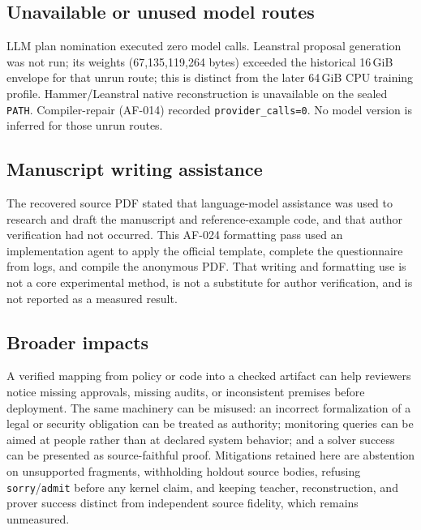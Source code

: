 \subsection{Unavailable or unused model routes}
\label{app:llm-unavailable}
LLM plan nomination executed zero model calls. Leanstral proposal generation
was not run; its weights (67{,}135{,}119{,}264 bytes) exceeded the historical 16\,GiB
envelope for that unrun route; this is distinct from the later 64\,GiB CPU training profile. Hammer/Leanstral native reconstruction is unavailable on the sealed
\texttt{PATH}. Compiler-repair (AF-014) recorded
\texttt{provider\_calls=0}. No model version is inferred for those unrun
routes.

\subsection{Manuscript writing assistance}
\label{app:llm-writing}
The recovered source PDF stated that language-model assistance was used to
research and draft the manuscript and reference-example code, and that author
verification had not occurred. This AF-024 formatting pass used an
implementation agent to apply the official template, complete the
questionnaire from logs, and compile the anonymous PDF. That writing and
formatting use is not a core experimental method, is not a substitute for
author verification, and is not reported as a measured result.

\subsection{Broader impacts}
\label{app:impacts}
A verified mapping from policy or code into a checked artifact can help
reviewers notice missing approvals, missing audits, or inconsistent premises
before deployment. The same machinery can be misused: an incorrect
formalization of a legal or security obligation can be treated as authority;
monitoring queries can be aimed at people rather than at declared system
behavior; and a solver success can be presented as source-faithful proof.
Mitigations retained here are abstention on unsupported fragments, withholding
holdout source bodies, refusing \texttt{sorry}/\texttt{admit} before any
kernel claim, and keeping teacher, reconstruction, and prover success distinct
from independent source fidelity, which remains unmeasured.

